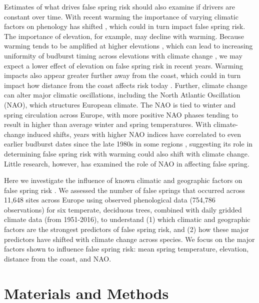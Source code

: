 \documentclass{article}\usepackage[]{graphicx}\usepackage[]{color}
\begin{document}
Estimates of what drives false spring risk should also examine if drivers are constant over time. With recent warming the importance of varying climatic factors on phenology has shifted \citep[e.g.,][]{Cook2016,Gauzere2019}, which could in turn impact false spring risk. The importance of elevation, for example, may decline with warming. Because warming tends to be amplified at higher elevations \citep{Giorgi1997,Rangwala2012,Pepin2015}, which can lead to increasing uniformity of budburst timing across elevations with climate change \citep{Vitasse2018}, we may expect a lower effect of elevation on false spring risk in recent years. Warming impacts also appear greater further away from the coast, which could in turn impact how distance from the coast affects risk today \citep{Wypych2016a,Ma2018}. Further, climate change can alter major climatic oscillations, including the North Atlantic Oscillation (NAO), which structures European climate. The NAO  is tied to winter and spring circulation across Europe, with more positive NAO phases tending to result in higher than average winter and spring temperatures. With climate-change induced shifts, years with higher NAO indices have correlated to even earlier budburst dates since the late 1980s in some regions \citep{Chmielewski2001}, suggesting its role in determining false spring risk with warming could also shift with climate change. Little research, however, has examined the role of NAO in affecting false spring. 

Here we investigate the influence of known climatic and geographic factors on false spring risk \citep[defined here as when temperatures fell below -2.2$^{\circ}$ between estimated budburst and leafout for all species included in the study,][]{Schwartz1993}. We assessed the number of false springs that occurred across 11,648 sites across Europe using observed phenological data (754,786 observations) for six temperate, deciduous trees, combined with daily gridded climate data (from 1951-2016),  to understand (1) which climatic and geographic factors are the strongest predictors of false spring risk, and (2) how these major predictors have shifted with climate change across species. We focus on the major factors shown to influence false spring risk: mean spring temperature, elevation, distance from the coast, and NAO. 

\section*{Materials and Methods} %
\end{document}
